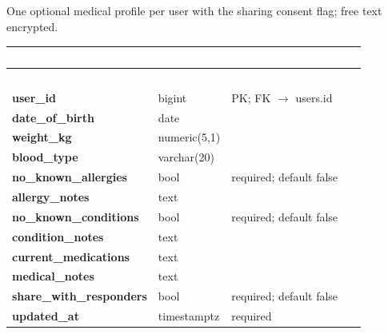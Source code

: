 \subsection*{}
One optional medical profile per user with the sharing consent flag; free text encrypted.\par\vspace{2pt}
{\tabfont\rowband
\begin{longtable}{@{}>{\raggedright\arraybackslash}p{}>{\raggedright\arraybackslash}p{}>{\raggedright\arraybackslash}p{}@{}}
\rowcolor{najdanavy}\textcolor{white}{\sffamily\bfseries\small Column} & \textcolor{white}{\sffamily\bfseries\small Type} & \textcolor{white}{\sffamily\bfseries\small Constraints and notes}\\
\endfirsthead
\rowcolor{najdanavy}\textcolor{white}{\sffamily\bfseries\small Column} & \textcolor{white}{\sffamily\bfseries\small Type} & \textcolor{white}{\sffamily\bfseries\small Constraints and notes}\\
\endhead
\bottomrule\endlastfoot
\textbf{user\_\allowbreak{}id} & bigint & PK; FK $\rightarrow$ users.id\\
\textbf{date\_\allowbreak{}of\_\allowbreak{}birth} & date & \\
\textbf{weight\_\allowbreak{}kg} & numeric(5,1) & \\
\textbf{blood\_\allowbreak{}type} & varchar(20) & \\
\textbf{no\_\allowbreak{}known\_\allowbreak{}allergies} & bool & required; default false\\
\textbf{allergy\_\allowbreak{}notes} & text & \\
\textbf{no\_\allowbreak{}known\_\allowbreak{}conditions} & bool & required; default false\\
\textbf{condition\_\allowbreak{}notes} & text & \\
\textbf{current\_\allowbreak{}medications} & text & \\
\textbf{medical\_\allowbreak{}notes} & text & \\
\textbf{share\_\allowbreak{}with\_\allowbreak{}responders} & bool & required; default false\\
\textbf{updated\_\allowbreak{}at} & timestamptz & required\\
\end{longtable}}


